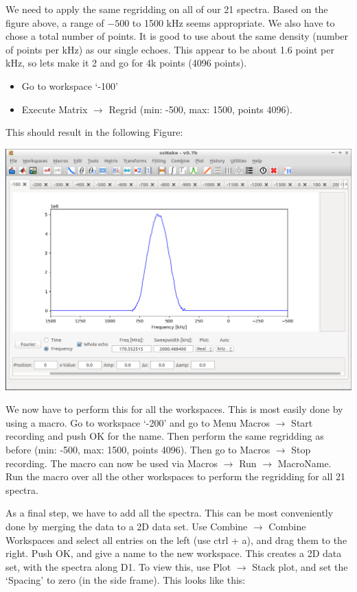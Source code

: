 \documentclass[11pt,a4paper]{article}
\begin{document}
We need to apply the same regridding on all of our 21 spectra.
Based on the figure above, a range of $-500$ to 1500 kHz seems appropriate.
We also have to chose a total number of points.
It is good to use about the same density (number of points per kHz) as our single echoes.
This appear to be about 1.6 point per kHz, so lets make it 2 and go for 4k points (4096 points). 


\begin{itemize}
\item Go to workspace `-100' 
 \item Execute Matrix $\longrightarrow$ Regrid (min: -500, max: 1500, points 4096).
\end{itemize}

This should result in the following Figure:

\begin{center}
\includegraphics[width=0.8\linewidth]{Figs/Fig2.png}
\end{center}
We now have to perform this for all the workspaces.
This is most easily done by using a macro.
Go to workspace `-200' and go to Menu Macros $\longrightarrow$ Start recording and push OK for the name.
Then perform the same regridding as before (min: -500, max: 1500, points 4096).
Then go to Macros $\longrightarrow$ Stop recording.
The macro can now be used via Macros $\longrightarrow$ Run $\longrightarrow$ MacroName.
Run the macro over all the other workspaces to perform the regridding for all 21 spectra.

As a final step, we have to add all the spectra.
This can be most conveniently done by merging the data to a 2D data set.
Use Combine $\longrightarrow$ Combine Workspaces and select all entries on the left (use ctrl + a), and drag them to the right.
Push OK, and give a name to the new workspace.
This creates a 2D data set, with the spectra along D1.
To view this, use Plot $\longrightarrow$ Stack plot, and set the `Spacing' to zero (in the side frame).
This looks like this:
\end{document}
